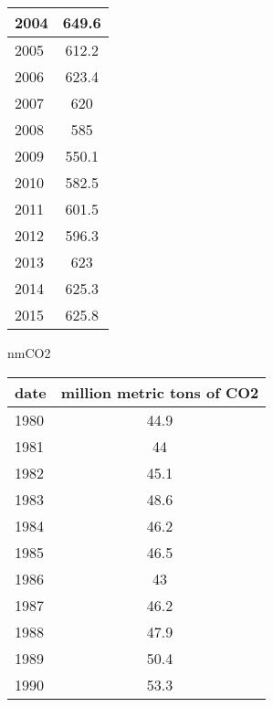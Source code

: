 \documentclass{mcmthesis}
\begin{document}
\begin{appendices}
\begin{minipage}{\textwidth}
\begin{minipage}[t]{0.45\textwidth}
\begin{tabular}{|l|c|}
        2004 & 649.6                      \\ \hline
        2005 & 612.2                      \\ \hline
        2006 & 623.4                      \\ \hline
        2007 & 620                        \\ \hline
        2008 & 585                        \\ \hline
        2009 & 550.1                      \\ \hline
        2010 & 582.5                      \\ \hline
        2011 & 601.5                      \\ \hline
        2012 & 596.3                      \\ \hline
        2013 & 623                        \\ \hline
        2014 & 625.3                      \\ \hline
        2015 & 625.8                      \\ \hline
        \end{tabular}
    \end{minipage}
    \begin{minipage}[t]{0.45\textwidth}
    \centering
          \makeatletter{}\makeatother\caption{nmCO2}
          \begin{tabular}{|l|c|}
            \hline
            date & million metric tons of CO2 \\ \hline
            1980 & 44.9                       \\ \hline
            1981 & 44                         \\ \hline
            1982 & 45.1                       \\ \hline
            1983 & 48.6                       \\ \hline
            1984 & 46.2                       \\ \hline
            1985 & 46.5                       \\ \hline
            1986 & 43                         \\ \hline
            1987 & 46.2                       \\ \hline
            1988 & 47.9                       \\ \hline
            1989 & 50.4                       \\ \hline
            1990 & 53.3                       \\ \hline

\end{tabular}
\end{minipage}
\end{minipage}
\end{appendices}
\end{document}
